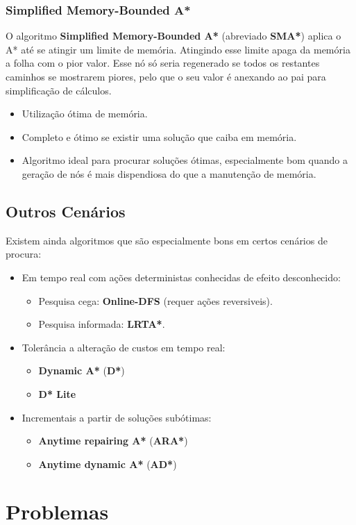 \documentclass[]{report}
\begin{document}
\subsection{Simplified Memory-Bounded A*}
O algoritmo \textbf{Simplified Memory-Bounded A*} (abreviado \textbf{SMA*}) aplica o A* até se atingir um limite de memória. Atingindo esse limite apaga da memória a folha com o pior valor. Esse nó só seria regenerado se todos os restantes caminhos se mostrarem piores, pelo que o seu valor é anexando ao pai para simplificação de cálculos.
\begin{itemize}
	\item Utilização ótima de memória.
	\item Completo e ótimo se existir uma solução que caiba em memória.
	\item Algoritmo ideal para procurar soluções ótimas, especialmente bom quando a geração de nós é mais dispendiosa do que a manutenção de memória.
\end{itemize}
\section{Outros Cenários}
Existem ainda algoritmos que são especialmente bons em certos cenários de procura:
\begin{itemize}
	\item Em tempo real com ações deterministas conhecidas de efeito desconhecido:
	\begin{itemize}
		\item Pesquisa cega: \textbf{Online-DFS} (requer ações reversiveis).
		\item Pesquisa informada: \textbf{LRTA*}.
	\end{itemize}
	\item Tolerância a alteração de custos em tempo real:
	\begin{itemize}
	\item \textbf{Dynamic A*} (\textbf{D*})
	\item \textbf{D* Lite}
	\end{itemize}
	\item Incrementais a partir de soluções subótimas:
	\begin{itemize}
	\item \textbf{Anytime repairing A*} (\textbf{ARA*})
	\item \textbf{Anytime dynamic A*} (\textbf{AD*})
	\end{itemize}
\end{itemize}
\chapter{Problemas}
\end{document}
